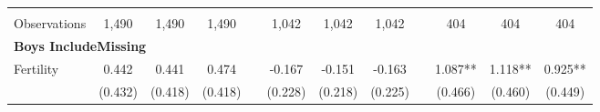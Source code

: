 \begin{landscape}
\begin{table}[htpb!]
\begin{center}
\begin{tabular}{lcccp{2mm}cccp{2mm}ccc}
\begin{footnotesize}\end{footnotesize}&\begin{footnotesize}\end{footnotesize}&\begin{footnotesize}\end{footnotesize}&\begin{footnotesize}\end{footnotesize}&\begin{footnotesize}\end{footnotesize}&\begin{footnotesize}\end{footnotesize}&\begin{footnotesize}\end{footnotesize}&\begin{footnotesize}\end{footnotesize}&\begin{footnotesize}\end{footnotesize}&\begin{footnotesize}\end{footnotesize}&\begin{footnotesize}\end{footnotesize}&\begin{footnotesize}\end{footnotesize}\\Observations&1,490&1,490&1,490&&1,042&1,042&1,042&&404&404&404\\
\multicolumn{12}{l}{\textbf{Boys IncludeMissing}}\\ 
Fertility&0.442&0.441&0.474&&-0.167&-0.151&-0.163&&1.087**&1.118**&0.925**\\
&(0.432)&(0.418)&(0.418)&&(0.228)&(0.218)&(0.225)&&(0.466)&(0.460)&(0.449)\\

\end{tabular}
\end{center}
\end{table}
\end{landscape}
